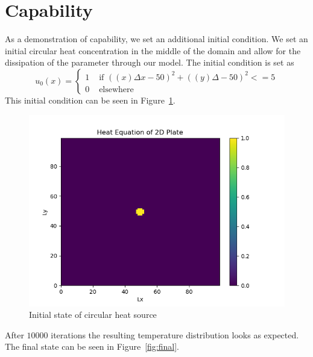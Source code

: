 \documentclass[12pt,letterpaper]{article}
\begin{document}
\section*{Capability}
As a demonstration of capability, we set an additional initial condition. We set an initial circular heat concentration in the middle of the domain and allow for the dissipation of the parameter through our model. The initial condition is set as 
\begin{equation}
        u_{0}(x)=\left\{\begin{array}{ll}
{1} & {\text { if } ((x)\Delta x - 50)^2 + ((y)\Delta  - 50)^2<= 5} \\
{0} & {\text { elsewhere }}
\end{array}\right.
\end{equation}
This initial condition can be seen in Figure~\ref{fig:init}. 
\begin{figure}[h!]
        \centering
        \includegraphics[scale = 0.5]{figs/init.png}
        \caption{Initial state of circular heat source}
        \label{fig:init}
\end{figure}
After $10000$ iterations the resulting temperature distribution looks as expected. The final state can be seen in Figure~\ref{fig:final}.
\end{document}
